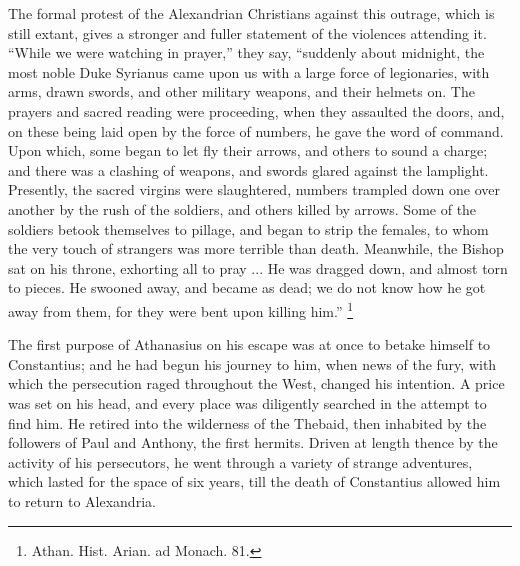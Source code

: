 The formal protest of the Alexandrian Christians against this
outrage, which is still extant, gives a stronger and fuller statement
of the violences attending it. ``While we were watching in
prayer,'' they say, ``suddenly about midnight, the most noble
Duke Syrianus came upon us with a large force of legionaries, with
arms, drawn swords, and other military weapons, and their helmets on.
The prayers and sacred reading were proceeding, when they assaulted
the doors, and, on these being laid open by the force of numbers,
he gave the word of command. Upon which, some began to let fly
their arrows, and others to sound a charge; and there was a clashing
of weapons, and swords glared against the lamplight. Presently, the
sacred virgins were slaughtered, numbers trampled down one over
another by the rush of the soldiers, and others killed by arrows. Some
of the soldiers betook themselves to pillage, and began to strip the
females, to whom the very touch of strangers was more terrible than
death. Meanwhile, the Bishop sat on his throne, exhorting all to pray
... He was dragged down, and almost torn to pieces. He swooned away,
and became as dead; we do not know how he got away from them, for they
were bent upon killing him.'' \footnote{Athan. Hist. Arian. ad Monach. 81.}

The first purpose of Athanasius on his escape was at once to betake
himself to Constantius; and he had begun his journey to him, when news
of the fury, with which the persecution raged throughout the West,
changed his intention. A price was set on his head, and every place
was diligently searched in the attempt to find him. He retired into
the wilderness of the Thebaid, then inhabited by the followers of Paul
and Anthony, the first hermits. Driven at length thence by the
activity of his persecutors, he went through a variety of strange
adventures, which lasted for the space of six years, till the death of
Constantius allowed him to return to Alexandria.

